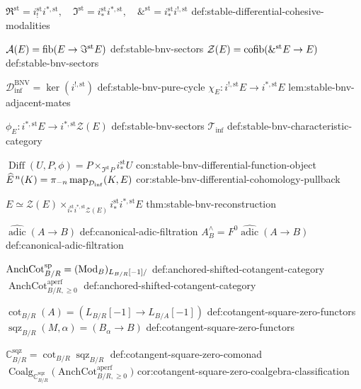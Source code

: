 \begin{longtable}
\NotationSingle
{\(\Re^{\mathrm{st}}=i_!^{\mathrm{st}}i^{*,\mathrm{st}},\quad
  \Im^{\mathrm{st}}=i_*^{\mathrm{st}}i^{*,\mathrm{st}},\quad
  \&^{\mathrm{st}}=i_*^{\mathrm{st}}i^{!,\mathrm{st}}\)}
{def:stable-differential-cohesive-modalities}

\NotationPair
{\(\mathcal A(E)=\operatorname{fib}(E\to\Im^{\mathrm{st}}E)\)}
{def:stable-bnv-sectors}
{\(\mathcal Z(E)=\operatorname{cofib}(\&^{\mathrm{st}}E\to E)\)}
{def:stable-bnv-sectors}

\NotationPair
{\(\mathcal D_{\inf}^{\mathrm{BNV}}=\ker(i^{!,\mathrm{st}})\)}
{def:stable-bnv-pure-cycle}
{\(\chi_E:i^{!,\mathrm{st}}E\to i^{*,\mathrm{st}}E\)}
{lem:stable-bnv-adjacent-mates}

\NotationPair
{\(\phi_E:i^{*,\mathrm{st}}E\to i^{*,\mathrm{st}}\mathcal Z(E)\)}
{def:stable-bnv-sectors}
{\(\mathcal T_{\inf}\)}
{def:stable-bnv-characteristic-category}

\NotationPair
{\(\operatorname{Diff}(U,P,\phi)=P\times_{\Im^{\mathrm{st}}P}i_*^{\mathrm{st}}U\)}
{con:stable-bnv-differential-function-object}
{\(\widehat E^{\,n}(K)=\pi_{-n}\operatorname{map}_{\mathcal D_{\inf}}(K,E)\)}
{cor:stable-bnv-differential-cohomology-pullback}

\NotationSingle
{\(E\simeq
  \mathcal Z(E)
  \times_{i_*^{\mathrm{st}}i^{*,\mathrm{st}}\mathcal Z(E)}
  i_*^{\mathrm{st}}i^{*,\mathrm{st}}E\)}
{thm:stable-bnv-reconstruction}



\NotationPair
{\(\widehat{\operatorname{adic}}(A\to B)\)}
{def:canonical-adic-filtration}
{\(A_B^\wedge=F^0\widehat{\operatorname{adic}}(A\to B)\)}
{def:canonical-adic-filtration}



\NotationPair
{\(\operatorname{AnchCot}^{\mathrm{sp}}_{B/R}
  =(\operatorname{Mod}_B)_{L_{B/R}[-1]/}\)}
{def:anchored-shifted-cotangent-category}
{\(\operatorname{AnchCot}^{\mathrm{aperf}}_{B/R,\geq0}\)}
{def:anchored-shifted-cotangent-category}

\NotationPair
{\(\operatorname{cot}_{B/R}(A)
  =(L_{B/R}[-1]\to L_{B/A}[-1])\)}
{def:cotangent-square-zero-functors}
{\(\operatorname{sqz}_{B/R}(M,\alpha)=(B_\alpha\to B)\)}
{def:cotangent-square-zero-functors}

\NotationPair
{\(\mathbb C^{\mathrm{sqz}}_{B/R}
  =\operatorname{cot}_{B/R}\operatorname{sqz}_{B/R}\)}
{def:cotangent-square-zero-comonad}
{\(\operatorname{Coalg}_{\mathbb C^{\mathrm{sqz}}_{B/R}}
  \bigl(\operatorname{AnchCot}^{\mathrm{aperf}}_{B/R,\geq0}\bigr)\)}
{cor:cotangent-square-zero-coalgebra-classification}



\end{longtable}
